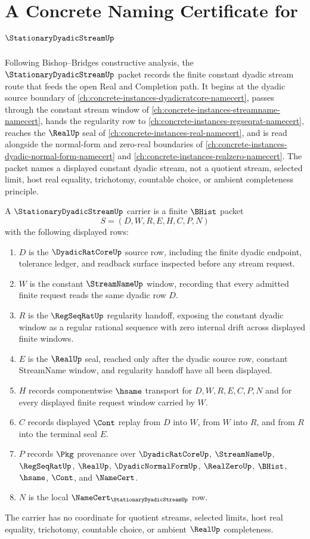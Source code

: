 \chapter{A Concrete Naming Certificate for $\StationaryDyadicStreamUp$}
\label{ch:concrete-instances-stationarydyadicstream-namecert}

Following Bishop--Bridges constructive analysis, the $\StationaryDyadicStreamUp$ packet records the finite constant dyadic stream route that feeds the open Real and Completion path. It begins at the dyadic source boundary of \autoref{ch:concrete-instances-dyadicratcore-namecert}, passes through the constant stream window of \autoref{ch:concrete-instances-streamname-namecert}, hands the regularity row to \autoref{ch:concrete-instances-regseqrat-namecert}, reaches the $\RealUp$ seal of \autoref{ch:concrete-instances-real-namecert}, and is read alongside the normal-form and zero-real boundaries of \autoref{ch:concrete-instances-dyadic-normal-form-namecert} and \autoref{ch:concrete-instances-realzero-namecert}. The packet names a displayed constant dyadic stream, not a quotient stream, selected limit, host real equality, trichotomy, countable choice, or ambient completeness principle.

\begin{definition}
\label{def:stationary-dyadic-stream-carrier}
A $\StationaryDyadicStreamUp$ carrier is a finite $\BHist$ packet
$$
S=(D,W,R,E,H,C,P,N)
$$
with the following displayed rows:
\begin{enumerate}
\item $D$ is the $\DyadicRatCoreUp$ source row, including the finite dyadic endpoint, tolerance ledger, and readback surface inspected before any stream request.
\item $W$ is the constant $\StreamNameUp$ window, recording that every admitted finite request reads the same dyadic row $D$.
\item $R$ is the $\RegSeqRatUp$ regularity handoff, exposing the constant dyadic window as a regular rational sequence with zero internal drift across displayed finite windows.
\item $E$ is the $\RealUp$ seal, reached only after the dyadic source row, constant StreamName window, and regularity handoff have all been displayed.
\item $H$ records componentwise $\hsame$ transport for $D,W,R,E,C,P,N$ and for every displayed finite request window carried by $W$.
\item $C$ records displayed $\Cont$ replay from $D$ into $W$, from $W$ into $R$, and from $R$ into the terminal seal $E$.
\item $P$ records $\Pkg$ provenance over $\DyadicRatCoreUp$, $\StreamNameUp$, $\RegSeqRatUp$, $\RealUp$, $\DyadicNormalFormUp$, $\RealZeroUp$, $\BHist$, $\hsame$, $\Cont$, and $\NameCert$.
\item $N$ is the local $\NameCert_{\StationaryDyadicStreamUp}$ row.
\end{enumerate}
The carrier has no coordinate for quotient streams, selected limits, host real equality, trichotomy, countable choice, or ambient $\RealUp$ completeness.
\end{definition}


